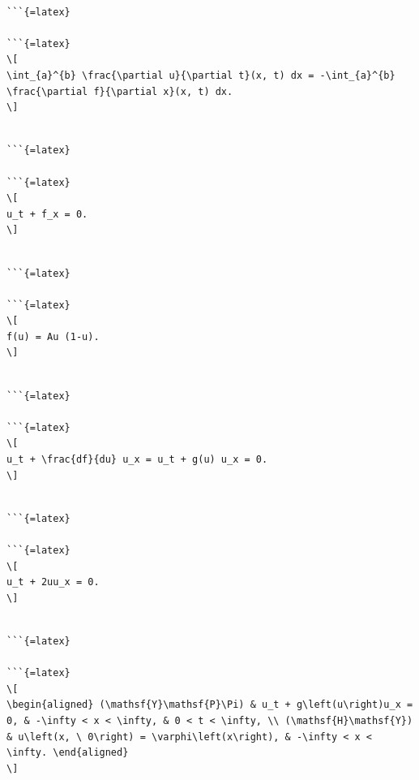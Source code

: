 \documentclass[
]{article}
\begin{document}
\begin{verbatim}

```{=latex}

```{=latex}
\[
\int_{a}^{b} \frac{\partial u}{\partial t}(x, t) dx = -\int_{a}^{b} \frac{\partial f}{\partial x}(x, t) dx.
\]
\end{verbatim}

\begin{verbatim}

```{=latex}

```{=latex}
\[
u_t + f_x = 0.
\]
\end{verbatim}

\begin{verbatim}

```{=latex}

```{=latex}
\[
f(u) = Au (1-u).
\]
\end{verbatim}

\begin{verbatim}

```{=latex}

```{=latex}
\[
u_t + \frac{df}{du} u_x = u_t + g(u) u_x = 0.
\]
\end{verbatim}

\begin{verbatim}

```{=latex}

```{=latex}
\[
u_t + 2uu_x = 0.
\]
\end{verbatim}

\begin{verbatim}

```{=latex}

```{=latex}
\[
\begin{aligned} (\mathsf{Y}\mathsf{P}\Pi) & u_t + g\left(u\right)u_x = 0, & -\infty < x < \infty, & 0 < t < \infty, \\ (\mathsf{H}\mathsf{Y}) & u\left(x, \ 0\right) = \varphi\left(x\right), & -\infty < x < \infty. \end{aligned}
\]
\end{verbatim}
\end{document}

